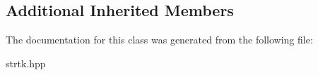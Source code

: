 \subsection*{Additional Inherited Members}


The documentation for this class was generated from the following file\-:\begin{DoxyCompactItemize}
\item 
strtk.\-hpp\end{DoxyCompactItemize}
